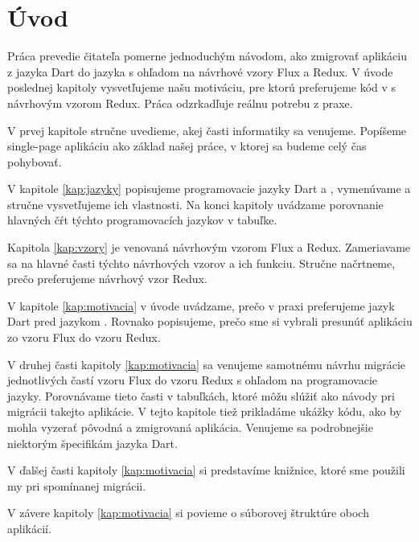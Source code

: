 \chapter*{Úvod} %

Práca prevedie čitateľa pomerne jednoduchým návodom, ako zmigrovať aplikáciu z jazyka Dart do jazyka \JS{} s ohľadom na návrhové vzory Flux a Redux. V úvode poslednej kapitoly vysvetľujeme našu motiváciu, pre ktorú preferujeme kód v \JS{} s návrhovým vzorom Redux. Práca odzrkadľuje reálnu potrebu z praxe.

V prvej kapitole stručne uvedieme, akej časti informatiky sa venujeme. Popíšeme single-page aplikáciu ako základ našej práce, v ktorej sa budeme celý čas pohybovať.

V kapitole \ref{kap:jazyky} popisujeme programovacie jazyky Dart a \JS{}, vymenúvame a stručne vysvetľujeme ich vlastnosti. Na konci kapitoly uvádzame porovnanie hlavných čŕt týchto programovacích jazykov v tabuľke.

Kapitola \ref{kap:vzory} je venovaná návrhovým vzorom Flux a Redux. Zameriavame sa na hlavné časti týchto návrhových vzorov a ich funkciu. Stručne načrtneme, prečo preferujeme návrhový vzor Redux.

V kapitole \ref{kap:motivacia} v úvode uvádzame, prečo v praxi preferujeme jazyk Dart pred jazykom \JS{}. Rovnako popisujeme, prečo sme si vybrali presunúť aplikáciu zo vzoru Flux do vzoru Redux.

V druhej časti kapitoly \ref{kap:motivacia} sa venujeme samotnému návrhu migrácie jednotlivých častí vzoru Flux do vzoru Redux s ohľadom na programovacie jazyky. Porovnávame tieto časti v tabuľkách, ktoré môžu slúžiť ako návody pri migrácii takejto aplikácie. V tejto kapitole tiež prikladáme ukážky kódu, ako by mohla vyzerať pôvodná a zmigrovaná aplikácia. Venujeme sa podrobnejšie niektorým špecifikám jazyka Dart.

V ďalšej časti kapitoly \ref{kap:motivacia} si predstavíme knižnice, ktoré sme použili my pri spomínanej migrácii.

V závere kapitoly \ref{kap:motivacia} si povieme o súborovej štruktúre oboch aplikácií.
